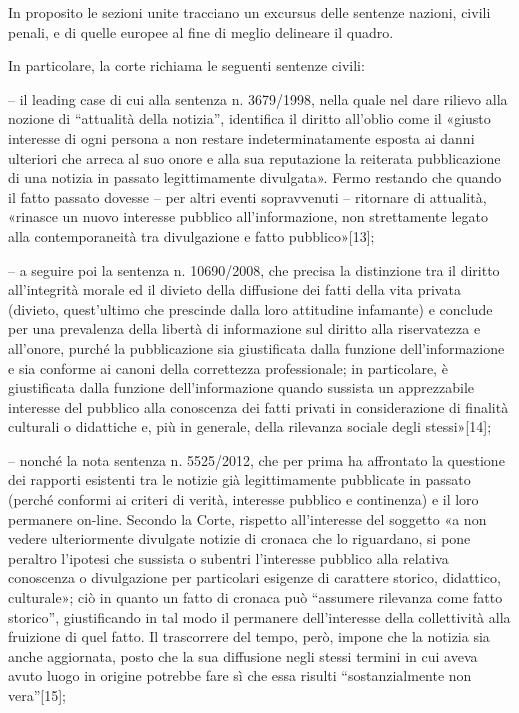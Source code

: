 In proposito le sezioni unite tracciano un excursus delle sentenze nazioni, civili penali, e di quelle europee al fine di meglio delineare il quadro.

In particolare, la corte richiama le seguenti sentenze civili:

– il leading case di cui alla sentenza n. 3679/1998, nella quale nel dare rilievo alla nozione di “attualità della notizia”, identifica il diritto all’oblio come il «giusto interesse di ogni persona a non restare indeterminatamente esposta ai danni ulteriori che arreca al suo onore e alla sua reputazione la reiterata pubblicazione di una notizia in passato legittimamente divulgata». Fermo restando che quando il fatto passato dovesse – per altri eventi sopravvenuti – ritornare di attualità, «rinasce un nuovo interesse pubblico all’informazione, non strettamente legato alla contemporaneità tra divulgazione e fatto pubblico»[13];

– a seguire poi la sentenza n. 10690/2008, che precisa la distinzione tra il diritto all’integrità morale ed il divieto della diffusione dei fatti della vita privata (divieto, quest’ultimo che prescinde dalla loro attitudine infamante) e conclude per una prevalenza della libertà di informazione sul diritto alla riservatezza e all’onore, purché la pubblicazione sia giustificata dalla funzione dell’informazione e sia conforme ai canoni della correttezza professionale; in particolare, è giustificata dalla funzione dell’informazione quando sussista un apprezzabile interesse del pubblico alla conoscenza dei fatti privati in considerazione di finalità culturali o didattiche e, più in generale, della rilevanza sociale degli stessi»[14];

– nonché la nota sentenza n. 5525/2012, che per prima ha affrontato la questione dei rapporti esistenti tra le notizie già legittimamente pubblicate in passato (perché conformi ai criteri di verità, interesse pubblico e continenza) e il loro permanere on-line. Secondo la Corte, rispetto all’interesse del soggetto «a non vedere ulteriormente divulgate notizie di cronaca che lo riguardano, si pone peraltro l’ipotesi che sussista o subentri l’interesse pubblico alla relativa conoscenza o divulgazione per particolari esigenze di carattere storico, didattico, culturale»; ciò in quanto un fatto di cronaca può “assumere rilevanza come fatto storico”, giustificando in tal modo il permanere dell’interesse della collettività alla fruizione di quel fatto. Il trascorrere del tempo, però, impone che la notizia sia anche aggiornata, posto che la sua diffusione negli stessi termini in cui aveva avuto luogo in origine potrebbe fare sì che essa risulti “sostanzialmente non vera”[15];

